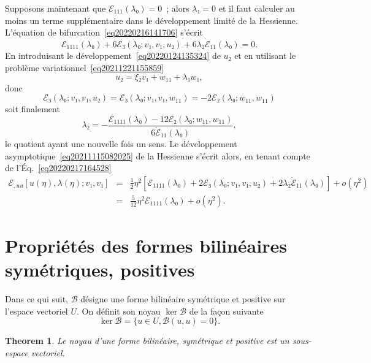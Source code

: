 \documentclass{article}
\newtheorem{theorem}{Theorem}
\begin{document}
Supposons maintenant que $ℰ_{1  1  1} (λ₀) =
0$~; alors $λ₁ = 0$ et il faut calculer au moins un terme
supplémentaire dans le développement limité de la Hessienne.
L'équation de bifurcation~\eqref{eq20220216141706} s'écrit
\begin{equation}
  \label{eq20220217164528} ℰ_{1  1  1  1}
  (λ₀) + 6ℰ₃ (λ₀ ; v₁, v₁, u₂) + 6 λ₂
  \dot{ℰ}_{1  1} (λ₀) = 0.
\end{equation}
En introduisant le développement~\eqref{eq20220124135324} de $u₂$ et en
utilisant le problème variationnel~\eqref{eq20211221155859}
\begin{equation}
  u₂ = ξ₂ v₁ + w_{1  1} + λ₁ w₁,
\end{equation}
donc
\begin{equation}
  ℰ₃ (λ₀ ; v₁, v₁, u₂) =ℰ₃ (λ₀ ; v₁,
  v₁, w_{1  1}) = - 2ℰ₂ (λ₀ ; w_{11}, w_{11})
\end{equation}
soit finalement
\begin{equation} λ₂ = - \frac{ℰ_{1  1  1  1}
   (λ₀) - 12ℰ₂ (λ₀ ; w_{11}, w_{11})}{6
   \dot{ℰ}_{1  1} (λ₀)}, \end{equation}
le quotient ayant une nouvelle fois un sens. Le développement
asymptotique~\eqref{eq20211115082025} de la Hessienne s'écrit alors, en
tenant compte de l'Éq.~\eqref{eq20220217164528}
\begin{eqnarray}
  ℰ_{, u  u} [u (η), λ (η) ; v₁, v₁] & = &
  \tfrac{1}{2} η^2  [ℰ_{1  1  1  1}
  (λ₀) + 2ℰ₃ (λ₀ ; v₁, v₁, u₂) + 2 λ₂
  \dot{ℰ}_{1  1} (λ₀)] + o (η^2) \nonumber\\
  & = & \tfrac{5}{12} η^2 ℰ_{1  1  1  1}
  (λ₀) + o (η^2) .
\end{eqnarray}

\section{Propriétés des formes bilinéaires symétriques,
positives}

Dans ce qui suit, $\mathcal{B}$ désigne une forme bilinéaire
symétrique et positive sur l'espace vectoriel $U$. On définit son
noyau $\ker \mathcal{B}$ de la fa{\c c}on suivante
\begin{equation}
  \ker \mathcal{B}= \{u∈U, \mathcal{B}(u, u) = 0\} .
\end{equation}
\begin{theorem}
  Le noyau d'une forme bilinéaire, symétrique et positive est un
  sous-espace vectoriel.
\end{theorem}
\end{document}
